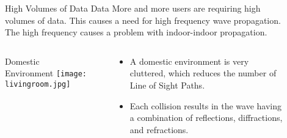 \documentclass[final]{beamer}
\theoremstyle{plain}
\theoremstyle{definition}
\theoremstyle{remark}
\newlength{\sepwid}
\newlength{\onecolwid}
\newlength{\twocolwid}
\begin{document}
\begin{frame}[t]
\begin{columns}[t]
\begin{column}{\onecolwid}

\end{column} %

\begin{column}{\sepwid}\end{column} %

\begin{column}{\twocolwid} %


\begin{alertblock}{High Volumes of Data Data}
More and more users are requiring high volumes of data. This causes a need for high frequency wave propagation.
\\ 
The high frequency causes a problem with indoor-indoor propagation.
\end{alertblock}

\begin{columns}
\begin{column}{0.45\linewidth}

\begin{block}{Domestic Environment}
\vspace{-1cm}
\texttt{[image: livingroom.jpg]} 
\end{block}

\end{column}
\begin{column}{0.01\linewidth}

\end{column}
\begin{column}{0.45\linewidth}
\vspace{-1.25cm}
\begin{mdframed}[backgroundcolor=white, userdefinedwidth=0.999999\linewidth]
\vspace{0.5cm}
\begin{itemize}
\item A domestic environment is very cluttered, which reduces the number of Line of Sight Paths.
\item Each collision results in the wave having a combination of reflections, diffractions, and refractions. 
\end{itemize}
\vspace{0.5cm}
\end{mdframed}


\end{column}
\end{columns}
\end{column}
\end{columns}
\end{frame}
\end{document}
